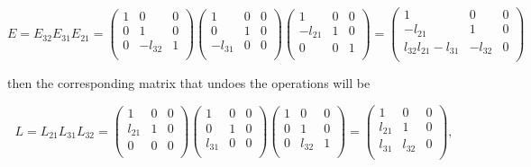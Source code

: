 \documentclass[a4paper,12pt]{report}
\begin{document}
\begin{equation}
    E = E_{32}E_{31}E_{21}    = \begin{pmatrix}
        1 & 0 &  0 \\
        0 & 1 &  0 \\
        0 & -l_{32}  &  1 \\
    \end{pmatrix}\begin{pmatrix}
        1 & 0 &  0 \\
        0 & 1 &  0 \\
        -l_{31}  & 0 &  0 \\
    \end{pmatrix}\begin{pmatrix}
        1 & 0 &  0 \\
        -l_{21} & 1 &  0 \\
        0 & 0 &  1 \\
    \end{pmatrix} = \begin{pmatrix}
        1 & 0 &  0 \\
        -l_{21}  & 1 &  0 \\
        l_{32}l_{21}-l_{31} & -l_{32}  &  0 \\
    \end{pmatrix}
\end{equation}

then the corresponding matrix that undoes the operations will be 

\begin{equation}
    L = L_{21}L_{31}L_{32} = \begin{pmatrix}
        1 & 0 &  0 \\
        l_{21}  & 1 &  0 \\
        0 & 0 &  0 \\
    \end{pmatrix}\begin{pmatrix}
        1 & 0 &  0 \\
        0 & 1 &  0 \\
        l_{31}  & 0 &  0 \\
    \end{pmatrix}\begin{pmatrix}
        1 & 0 &  0 \\
        0 & 1 &  0 \\
        0 & l_{32} &  1 \\
    \end{pmatrix} = \begin{pmatrix}
        1 & 0 &  0 \\
        l_{21}  & 1 &  0 \\
        l_{31}  & l_{32}  &  0 \\
    \end{pmatrix},
\end{equation}
\end{document}

